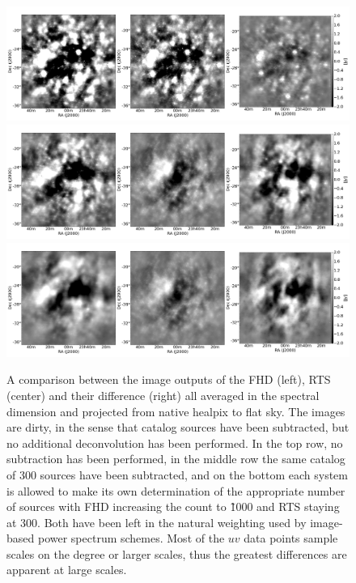 \documentclass[preprint]{aastex}
\begin{document}
\begin{figure}[htb]
\begin{center}
\includegraphics[width=1\textwidth]{figures/FHD_RTS_dirty_compare_31March2015.png}
\includegraphics[width=1\textwidth]{figures/FHD_2014c_RTS_March_2015.png}
\includegraphics[width=1\textwidth]{figures/FHD_2014c_RTSnominal.png}
\caption{A comparison between the image outputs of the FHD (left), RTS (center) and their difference (right) all averaged in the spectral dimension and projected from native healpix to flat sky.  The images are dirty, in the sense that catalog sources have been subtracted, but no additional deconvolution has been performed.  In the top row, no subtraction has been performed, in the middle row the same catalog of 300 sources have been subtracted, and on the bottom each system is allowed to make its own determination of the appropriate number of sources with FHD increasing the count to \~1000 and RTS staying at 300. Both have been left in the natural weighting used by image-based power spectrum schemes. Most of the $uv$ data points sample scales on the degree or larger scales, thus the greatest differences are apparent at large scales.     \label{fig:image_compare}}
\end{center}
\end{figure}
\end{document}
